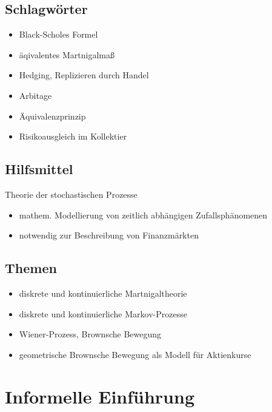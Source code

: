 \documentclass[a4paper, pagesize=pdftex, pdftex, twoside, headsepline, index=totoc,toc=listof, fontsize=10pt, cleardoublepage=empty, headinclude, DIV=13, BCOR=13mm]{scrartcl}
\begin{document}
\subsection*{Schlagwörter} %
\label{sub: schlagwörter}

\begin{itemize}
	\item Black-Scholes Formel
	\item äqivalentes Martnigalmaß
	\item Hedging, Replizieren durch Handel
	\item Arbitage
	\item Äquivalenzprinzip
	\item Risikoausgleich im Kollektier
\end{itemize}

\subsection*{Hilfsmittel} %
\label{sub:hilfsmittel}

Theorie der stochastischen Prozesse
\begin{itemize}
	\item mathem. Modellierung von zeitlich abhängigen Zufallsphänomenen
	\item notwendig zur Beschreibung von Finanzmärkten
\end{itemize}

\subsection*{Themen} %
\label{sub: themen}

\begin{itemize}
	\item diskrete und kontinuierliche Martnigaltheorie
	\item diskrete und kontinuierliche Markov-Prozesse
	\item Wiener-Prozess, Brownsche Bewegung
	\item geometrische Brownsche Bewegung als Modell für Aktienkurse
\end{itemize}


\newpage

\section{Informelle Einführung} %
\label{sec: informelle_einführung}
\end{document}
